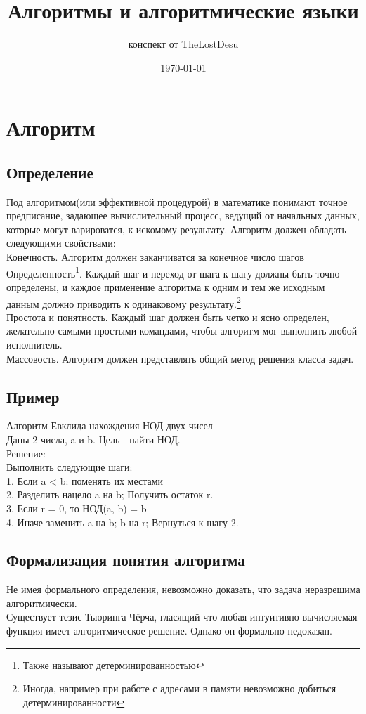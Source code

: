 \documentclass[a4paper,12pt]{article}
\author{конспект от TheLostDesu}
\title{Алгоритмы и алгоритмические языки}
\date{\today}
\begin{document}
\maketitle
\section{Алгоритм}
\subsection{Определение}
Под алгоритмом(или эффективной процедурой) в математике понимают точное предписание,
задающее вычислительный процесс, ведущий от начальных данных, которые могут варироватся, к искомому результату. Алгоритм должен обладать следующими свойствами:\\
Конечность. Алгоритм должен заканчиватся за конечное число шагов\\
Определенность\footnote{Также называют детерминированностью}. Каждый шаг и переход от шага к шагу должны быть точно определены, и каждое применение алгоритма к одним и тем же исходным данным должно приводить к одинаковому результату.\footnote{Иногда, например при работе с адресами в памяти невозможно добиться детерминированности}\\
Простота и понятность. Каждый шаг должен быть четко и ясно определен, желательно самыми простыми командами, чтобы алгоритм мог выполнить любой исполнитель.\\
Массовость. Алгоритм должен представлять общий метод решения класса задач.

\subsection{Пример}
Алгоритм Евклида нахождения НОД двух чисел\\
Даны 2 числа, a и b. Цель - найти НОД.\\
Решение:\\
Выполнить следующие шаги:\\
1. Если a < b: поменять их местами\\
2. Разделить нацело a на b; Получить остаток r.\\
3. Если 	r = 0, то НОД(a, b) = b\\
4. Иначе заменить a на b; b на r; Вернуться к шагу 2.

\subsection{Формализация понятия алгоритма}
Не имея формального определения, невозможно доказать, что задача неразрешима алгоритмически.\\
Существует тезис Тьюринга-Чёрча, гласящий что любая интуитивно вычисляемая функция имеет алгоритмическое решение. Однако он формально недоказан. 
\end{document}
